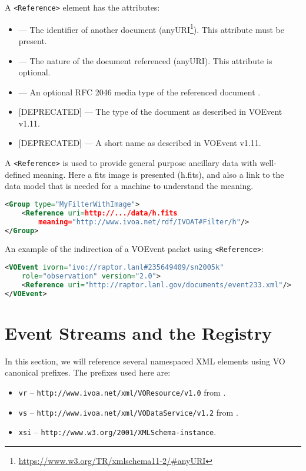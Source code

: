 \documentclass[11pt,a4paper]{ivoa}
\begin{document}
A \verb|<Reference>| element has the attributes:
\begin{itemize}
\item {}\label{sec:3.9.1} --- The identifier of another document
(anyURI\footnote{\url{https://www.w3.org/TR/xmlschema11-2/\#anyURI}}). This
attribute must be present.
\item {}\label{sec:3.9.2} --- The nature of the document
referenced (anyURI). This attribute is optional.
\item {}\label{sec:3.9.3} --- An optional RFC 2046 media
type of the referenced document \citep{std:MIME}.
\item {}\label{sec:3.9.4} [DEPRECATED] --- The type of the
document as described in VOEvent v1.11.
\item {}\label{sec:3.9.5} [DEPRECATED] --- A short name as
described in VOEvent v1.11.
\end{itemize}

A \verb|<Reference>| is used to provide general purpose ancillary data with
well-defined meaning. Here a fits image is presented (h.fits), and also a link
to the data model that is needed for a machine to understand the meaning.
\begin{lstlisting}[language=XML]
<Group type="MyFilterWithImage">
    <Reference uri=http://.../data/h.fits
        meaning="http://www.ivoa.net/rdf/IVOAT#Filter/h"/>
</Group>
\end{lstlisting}
An example of the indirection of a VOEvent packet using \verb|<Reference>|:
\begin{lstlisting}[language=XML]
<VOEvent ivorn="ivo://raptor.lanl#235649409/sn2005k"
    role="observation" version="2.0">
    <Reference uri="http://raptor.lanl.gov/documents/event233.xml"/>
</VOEvent>
\end{lstlisting}

\section{Event Streams and the Registry}
\label{sec:registry-matters}

In this section, we will reference several namespaced XML elements using
VO canonical prefixes.  The prefixes used here are:

\begin{itemize}
\item \verb|vr| -- \nolinkurl{http://www.ivoa.net/xml/VOResource/v1.0}
from \citet{2018ivoa.spec.0625P}.
\item \verb|vs| --
\nolinkurl{http://www.ivoa.net/xml/VODataService/v1.2}
from \citet{2021ivoa.spec.1102D}.
\item \verb|xsi| --
\nolinkurl{http://www.w3.org/2001/XMLSchema-instance}.
\end{itemize}
\end{document}
